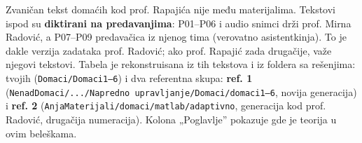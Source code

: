 \documentclass[11pt,a4paper,parskip=half,headsepline,numbers=noenddot]{scrartcl}
\begin{document}
Zvaničan tekst domaćih kod prof. Rapajića nije među materijalima. Tekstovi ispod su \textbf{diktirani na predavanjima}: P01--P06 i audio snimci drži prof. Mirna Radović, a P07--P09 predavačica iz njenog tima (verovatno asistentkinja). To je dakle verzija zadataka prof. Radović; ako prof. Rapajić zada drugačije, važe njegovi tekstovi. Tabela je rekonstruisana iz tih tekstova i iz foldera sa rešenjima: tvojih (\texttt{Domaci/\allowbreak{}Domaci1–6}) i dva referentna skupa: \textbf{ref. 1} (\texttt{NenadDomaci/\allowbreak{}.../\allowbreak{}Napredno\ upravljanje/\allowbreak{}Domaci/\allowbreak{}domaci1–6}, novija generacija) i \textbf{ref. 2} (\texttt{AnjaMaterijali/\allowbreak{}domaci/\allowbreak{}matlab/\allowbreak{}adaptivno}, generacija kod prof. Radović, drugačija numeracija). Kolona „Poglavlje'' pokazuje gde je teorija u ovim beleškama.
\end{document}
